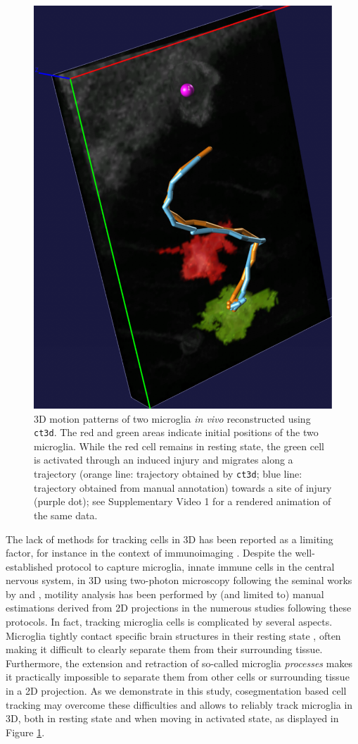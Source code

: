 \begin{figure}
  \centering
  \includegraphics[width=.7\linewidth]{images/coseg_fig1}
  \caption[3D motion patterns of two microglia \textit{in vivo} 
   reconstructed using \texttt{ct3d}]{3D motion patterns of two microglia \textit{in vivo}
    reconstructed using \texttt{ct3d}.  The red and green areas
    indicate initial positions of the two microglia. While the red
    cell remains in resting state, the green cell is activated through
    an induced injury and migrates along a trajectory (orange line:
    trajectory obtained by \texttt{ct3d}; blue line: trajectory
    obtained from manual annotation) towards a site of injury (purple
    dot); see Supplementary Video 1 for a rendered animation of the
    same data.}
  \label{fig:coseg-fig1}
\end{figure}

The lack of methods for tracking cells in 3D has been reported as a
limiting factor, for instance in the context of immunoimaging
\cite{Cahalan:08}. Despite the well-established protocol to capture
microglia, innate immune cells in the central nervous system, in 3D
using two-photon microscopy following the seminal works by
\cite{Nimmerjahn:05} and \cite{Davalos:05}, motility analysis has
been performed by (and limited to) manual estimations derived from 2D
projections \cite{Davalos:08} in the numerous studies following these
protocols. In fact, tracking microglia cells is complicated by several
aspects. Microglia tightly contact specific brain structures in their
resting state \cite{Wake:09}, often making it difficult to clearly
separate them from their surrounding tissue. Furthermore, the
extension and retraction of so-called microglia \emph{processes} makes
it practically impossible to separate them from other cells or
surrounding tissue in a 2D projection. As we demonstrate in this
study, cosegmentation based cell tracking may overcome these
difficulties and allows to reliably track microglia in 3D, both in
resting state and when moving in activated state, as displayed in
Figure \ref{fig:coseg-fig1}.

